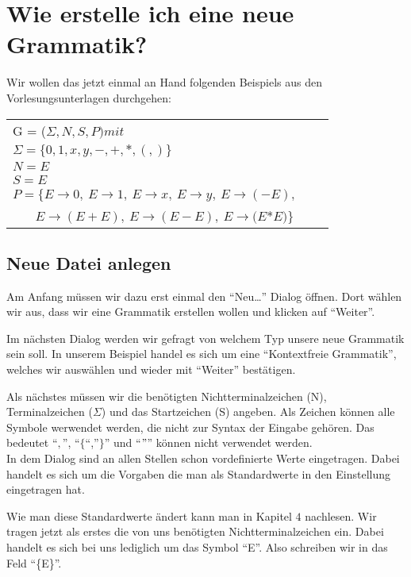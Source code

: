 \chapter{Wie erstelle ich eine neue Grammatik?}

Wir wollen das jetzt einmal an Hand folgenden Beispiels aus den
Vorlesungsunterlagen durchgehen:\vspace{10pt}



\begin{tabular}{lcr}
G = ($\Sigma, N, S, P ) mit $\\
	$\Sigma = \{0, 1, x, y, -, +, *, (, )\}$\\
	$N = {E}$\\
	$S=E$\\ 
	$P = \{E \to 0,\ E \to 1,\ E \to x,\ E \to y,\ E \to (-E),$\\
	$\ \ \ \ \ \ \ \ E \to (E + E),\ E \to (E - E),\ E \to (E $*$ E)\}$\\
\end{tabular}

\section{Neue Datei anlegen}
 
Am Anfang müssen wir dazu erst einmal den "`Neu\ldots"' Dialog öffnen. Dort
wählen wir aus, dass wir eine Grammatik erstellen wollen und klicken auf
"`Weiter"'.\vspace{10pt}

Im nächsten Dialog werden wir gefragt von welchem Typ unsere neue Grammatik
sein soll. In unserem Beispiel handel es sich um eine "`Kontextfreie Grammatik"',
welches wir auswählen und wieder mit "`Weiter"' bestätigen.\vspace{10pt}

Als nächstes müssen wir die benötigten Nichtterminalzeichen (N),
Terminalzeichen ($\Sigma$) und das Startzeichen (S) angeben.  Als Zeichen
können alle Symbole werwendet werden, die nicht zur Syntax der Eingabe gehören.
Das bedeutet "`$,$"', "`$\{$"`,"'$\}$"' und "`$"$"' können nicht verwendet
werden.\\

In dem Dialog sind an allen Stellen schon vordefinierte Werte eingetragen.
Dabei handelt es sich um die Vorgaben die man als Standardwerte in den Einstellung eingetragen hat.

Wie man diese Standardwerte ändert kann man in Kapitel $4$ nachlesen. Wir tragen
jetzt als erstes die von uns benötigten Nichtterminalzeichen ein. Dabei handelt
es sich bei uns lediglich um das Symbol "`E"'. Also schreiben wir in das Feld
"`\{E\}"'.\\

